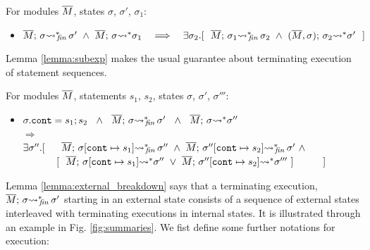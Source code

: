  \begin{auxLemma}
 \label{lemma:encl:tem}
 For   modules $\overline{M}$,   states $\sigma$, $\sigma'$, $\sigma_1$:
\begin{itemize}
\item
$  \leadstoBoundedStarFin {\Mtwo}  {\sigma}  {\sigma'} \  \wedge \  \leadstoBoundedStar  {\Mtwo}  {\sigma}  {\sigma_1} 
\ \ \  \Longrightarrow\ \ \  %
 \exists \sigma_2.[\ \ \leadstoBoundedStarFin {\Mtwo} {\sigma_1}  {\sigma_2}  
\ \wedge\ 
\leadstoBoundedStarThree  {\Mtwo}  {\sigma_2}  {\sigma}   {\sigma'} \ \ ]$
\end{itemize}

\end{auxLemma} 
 
Lemma \ref{lemma:subexp} makes the usual guarantee about terminating execution of statement sequences.
  
\begin{auxLemma}
\label{lemma:subexp}
For modules $\overline{M}$, statements $s_1$, $s_2$,  states $\sigma$, $\sigma'$, $\sigma'''$:
\begin{itemize}
\item
$ \sigma.\texttt{cont} = s_1; s_2 \ \ \wedge\ \  \leadstoBoundedStarFin {\Mtwo}  {\sigma}  {\sigma'}\ \ 
\wedge \ \
\leadstoBoundedStar {\Mtwo}  {\sigma}  {\sigma''}\
$\\
$  \Longrightarrow$\\
$   \exists \sigma''.[\ \ \ \ \   \leadstoBoundedStarFin {\Mtwo} {\sigma[\texttt{cont}\mapsto s_1]}  {\sigma''}  
\ \wedge\ 
\leadstoBoundedStarFin {\Mtwo} {\sigma''[\texttt{cont}\mapsto s_2]}   {\sigma'} \  \wedge$
\\
$\strut \hspace{1.2cm}  [ \ \ \overline{M};\, {\sigma[\texttt{cont}\mapsto s_1]} {\rightsquigarrow^*} \sigma''\ \vee \ \overline{M};\, {\sigma''[\texttt{cont}\mapsto s_2]} {\rightsquigarrow^*} \sigma'''\ ]\ \ \ \ \ \ \ \  \ ] $
\end{itemize}
\end{auxLemma}
 

Lemma \ref{lemma:external_breakdown} says that a terminating execution,  $ \overline{M};\, {\sigma} {\rightsquigarrow^*}\!\!_{\mathit{fin}}\, \sigma'$ starting in an external state  consists of a sequence of  external states interleaved with terminating executions in internal states. 
It %
is illustrated through an example in Fig. \ref{fig:summaries}.
We fist define some further notations for execution:

